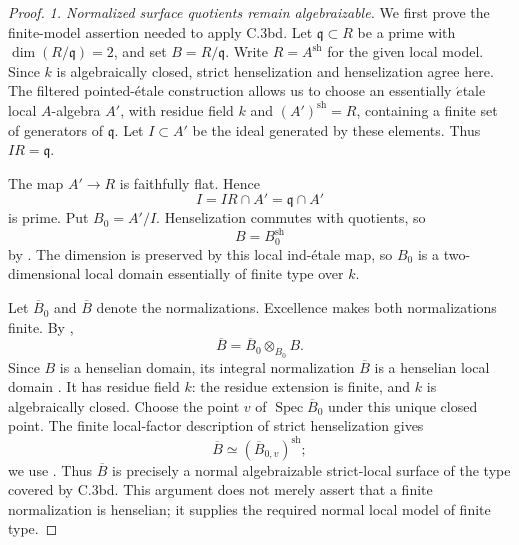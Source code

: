 \begin{proof}
\emph{1. Normalized surface quotients remain algebraizable.}
We first prove the finite-model assertion needed to apply C.3bd.
Let \(\mathfrak q\subset R\) be a prime with
\(\dim(R/\mathfrak q)=2\), and set \(B=R/\mathfrak q\).
Write \(R=A^{\mathrm{sh}}\) for the given local model. Since
\(k\) is algebraically closed, strict henselization and
henselization agree here. The filtered pointed-\'etale construction
\citep[Lemmas 10.155.1--2]{frC3beStacksHenselConstruction}
allows us to choose an essentially \(\acute{e}\)tale local
\(A\)-algebra \(A'\), with residue field \(k\) and
\((A')^{\mathrm{sh}}=R\), containing a finite set of generators
of \(\mathfrak q\). Let \(I\subset A'\) be the ideal generated
by these elements. Thus \(IR=\mathfrak q\).

The map \(A'\to R\) is faithfully flat. Hence
\[
                 I=IR\cap A'=\mathfrak q\cap A'
\]
is prime. Put \(B_0=A'/I\). Henselization commutes with
quotients, so
\begin{equation}\label{eq:C3be-surface-model}
                         B=B_0^{\mathrm{sh}}
\end{equation}
by \citet[Lemma 10.156.4, Tag 05WS]
{frC3beStacksQuotientHenselization}.
The dimension is preserved by this local ind-\'etale map, so
\(B_0\) is a two-dimensional local domain essentially of finite
type over \(k\).

Let \(\overline B_0\) and \(\overline B\) denote the
normalizations. Excellence makes both normalizations finite.
By \citet[Lemma 37.19.4, Tag 0CBM]
{frC3beStacksNormalizationHenselization},
\[
                 \overline B
                    =\overline B_0\otimes_{B_0}B.
\]
Since \(B\) is a henselian domain, its integral normalization
\(\overline B\) is a henselian local domain
\citep[Lemma 15.106.23, Tag 092X]
{frC3beStacksIntegralHenselian}.
It has residue field \(k\): the residue extension is finite,
and \(k\) is algebraically closed.
Choose the point \(v\) of \(\operatorname{Spec}\overline B_0\)
under this unique closed point. The finite local-factor
description of strict henselization gives
\begin{equation}\label{eq:C3be-normalized-model}
              \overline B
                 \simeq(\overline B_{0,v})^{\mathrm{sh}};
\end{equation}
we use \citet[Lemma 10.156.3, Tag 05WR]
{frC3beStacksFiniteHenselization}.
Thus \(\overline B\) is precisely a normal algebraizable
strict-local surface of the type covered by C.3bd. This argument
does not merely assert that a finite normalization is henselian;
it supplies the required normal local model of finite type.


\end{proof}
